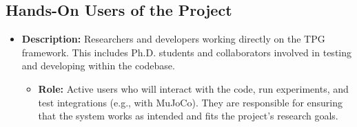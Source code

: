 \documentclass[12pt]{article}
\begin{document}
\subsection{Hands-On Users of the Project}
\begin{itemize}
  \item \textbf{Description:}  Researchers and developers working directly on the TPG framework. This includes Ph.D. students and collaborators involved in testing and developing within the codebase.
    \begin{itemize}
      \item \textbf{Role:} Active users who will interact with the code, run experiments, and test integrations (e.g., with MuJoCo). They are responsible for ensuring that the system works as intended and fits the project's research goals.

    \end{itemize}

  \end{itemize}
\end{document}
